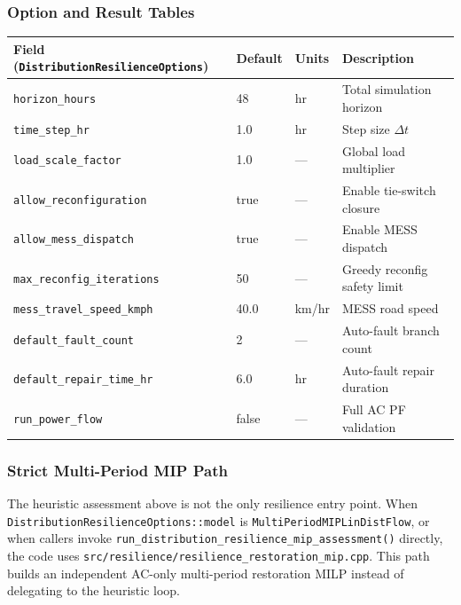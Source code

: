 \subsubsection{Option and Result Tables}
\label{sec:resilience-tables}

\begin{center}
\begin{tabular}{lllp{50mm}}
\hline\hline
\textbf{Field (\texttt{DistributionResilienceOptions})} & \textbf{Default} & \textbf{Units} & \textbf{Description} \\
\hline
\texttt{horizon\_hours}           & 48     & hr    & Total simulation horizon \\
\texttt{time\_step\_hr}           & 1.0    & hr    & Step size $\Delta t$ \\
\texttt{load\_scale\_factor}      & 1.0    & ---   & Global load multiplier \\
\texttt{allow\_reconfiguration}   & true   & ---   & Enable tie-switch closure \\
\texttt{allow\_mess\_dispatch}    & true   & ---   & Enable MESS dispatch \\
\texttt{max\_reconfig\_iterations}& 50     & ---   & Greedy reconfig safety limit \\
\texttt{mess\_travel\_speed\_kmph}& 40.0   & km/hr & MESS road speed \\
\texttt{default\_fault\_count}    & 2      & ---   & Auto-fault branch count \\
\texttt{default\_repair\_time\_hr}& 6.0    & hr    & Auto-fault repair duration \\
\texttt{run\_power\_flow}         & false  & ---   & Full AC PF validation \\
\hline\hline
\end{tabular}
\end{center}

\subsubsection{Strict Multi-Period MIP Path}
\label{sec:resilience-mip}

The heuristic assessment above is not the only resilience entry point.  When
\texttt{DistributionResilienceOptions::model} is
\texttt{MultiPeriodMIPLinDistFlow}, or when callers invoke
\texttt{run\_distribution\_resilience\_mip\_assessment()} directly, the code
uses \texttt{src/resilience/resilience\_restoration\_mip.cpp}.  This path builds
an independent AC-only multi-period restoration MILP instead of delegating to
the heuristic loop.

